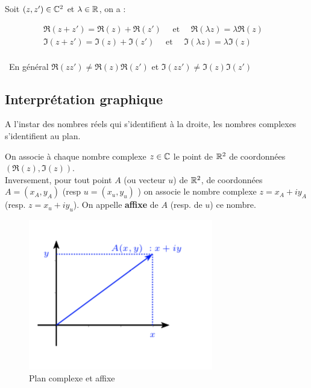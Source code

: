 \documentclass[a4paper, 11pt]{article}
\begin{document}
\begin{prop}
Soit $(z,z') \in \mathbb{C}^2$ et $\lambda \in \mathbb{R}$, on  a :

\begin{align*}
&\Re(z+z') =\Re(z) +\Re(z') \quad  \text{ et }  \quad  \Re(\lambda z) = \lambda \Re(z) &&\\
&\Im(z+z') =\Im(z) +\Im(z') \quad  \text{ et }  \quad \Im(\lambda z) = \lambda \Im(z)&&\\
\end{align*}
\end{prop}

\begin{remarques}
\item \warning\,  En général $\Re(zz') \neq \Re(z) \Re(z')$  et $\Im(zz') \neq \Im(z) \Im(z')$
\end{remarques}

\subsection{Interprétation graphique}

A l'instar des nombres réels qui s'identifient à la droite, les nombres complexes s'identifient au plan. 
\begin{defi}
On associe à chaque nombre complexe $z\in\mathbb{C}$ le point de $\mathbb{R}^2$ de coordonnées $(\Re(z), \Im(z))$. \\
Inversement, pour tout point $A$ (ou vecteur $u$) de $\mathbb{R}^2$, de coordonnées  $A=(x_A,y_A)$ (resp  $u = (x_u, y_u)$ ) on associe le nombre complexe $z =x_A+iy_A$ (resp. $z=x_u+iy_u$). On appelle \textbf{affixe} de $A$ (resp. de $u$) ce nombre. 
\end{defi}
\begin{figure}[h]
\centering
\includegraphics[scale=1]{images/affixe}
\vspace{-0.4cm}
\caption{Plan complexe et affixe}
\end{figure}
\end{document}
